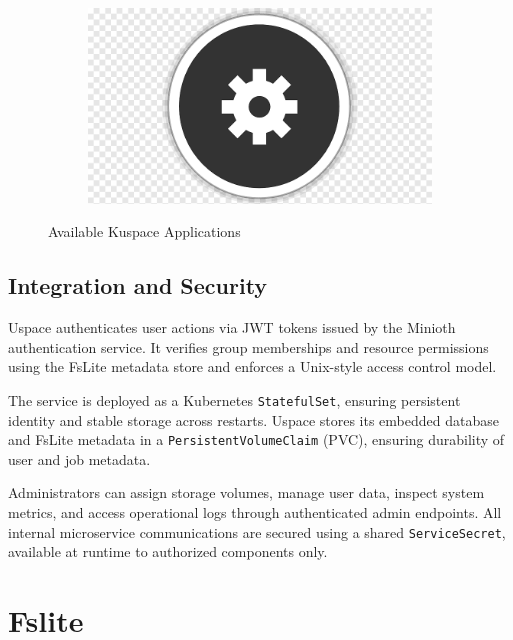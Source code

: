 \begin{figure}[h!]
\begin{subfigure}[b]{0.1\textwidth}
    \label{fig:bash}
  \end{subfigure}
  \hfill
  \begin{subfigure}[b]{0.1\textwidth}
    \includegraphics[width=\textwidth]{Images/default_logo.png}
    \label{fig:caengine}
  \end{subfigure}

  \caption{Available Kuspace Applications}
  \label{fig:authservices}
\end{figure}


\subsection{Integration and Security}

Uspace authenticates user actions via JWT tokens issued by the Minioth authentication service. It verifies group memberships and resource permissions using the FsLite metadata store and enforces a Unix-style access control model.

The service is deployed as a Kubernetes \texttt{StatefulSet}, ensuring persistent identity and stable storage across restarts. Uspace stores its embedded database and FsLite metadata in a \texttt{PersistentVolumeClaim} (PVC), ensuring durability of user and job metadata.

Administrators can assign storage volumes, manage user data, inspect system metrics, and access operational logs through authenticated admin endpoints. All internal microservice communications are secured using a shared \texttt{ServiceSecret}, available at runtime to authorized components only.




\newpage



\section{Fslite}

